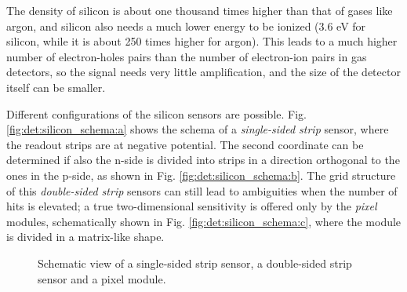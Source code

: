 The density of silicon is about one thousand times higher than that of gases like argon, and silicon also needs a much lower energy to be ionized (3.6 eV for silicon, while it is about 250 times higher for argon). This leads to a much higher number of electron-holes pairs than the number of electron-ion pairs in gas detectors, so the signal needs very little amplification, and the size of the detector itself can be smaller. 

Different configurations of the silicon sensors are possible. Fig. \ref{fig:det:silicon_schema:a} shows the schema of a \textit{single-sided strip} sensor, where the readout strips are at negative potential. The second coordinate can be determined if also the n-side is divided into strips in a direction orthogonal to the ones in the p-side, as shown in Fig. \ref{fig:det:silicon_schema:b}. The grid structure of this \textit{double-sided strip} sensors can still lead to ambiguities when the number of hits is elevated; a true two-dimensional sensitivity is offered only by the \textit{pixel} modules, schematically shown in Fig. \ref{fig:det:silicon_schema:c}, where the module is divided in a matrix-like shape.

\begin{figure}[ht]
\centering
{}
\caption{Schematic view of  a single-sided strip sensor,
 a double-sided strip sensor and  a pixel module. }
\label{fig:det:silicon_schema}
\end{figure}



